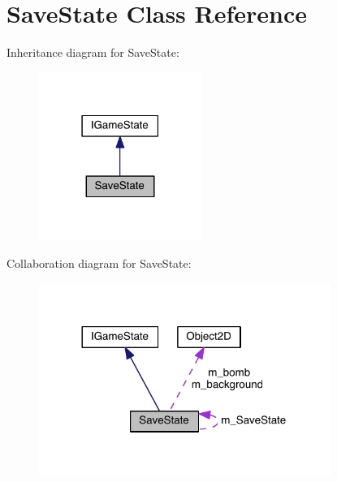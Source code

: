 \hypertarget{class_save_state}{}\section{Save\+State Class Reference}
\label{class_save_state}


Inheritance diagram for Save\+State\+:\nopagebreak
\begin{figure}[H]
\begin{center}
\leavevmode
\includegraphics[width=150pt]{class_save_state__inherit__graph}
\end{center}
\end{figure}


Collaboration diagram for Save\+State\+:\nopagebreak
\begin{figure}[H]
\begin{center}
\leavevmode
\includegraphics[width=269pt]{class_save_state__coll__graph}
\end{center}
\end{figure}
